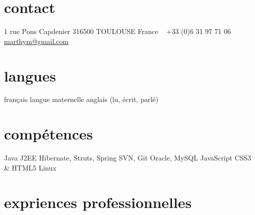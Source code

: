 \documentclass{friggeri-cv} 	%
\begin{document}


\begin{aside} %
\section{contact}
1 rue Pons Capdenier
316500 TOULOUSE
France
~
+33 (0)6 31 97 71 06
\href{mailto:marthym@gmail.com}{marthym@gmail.com}
\section{langues}
français langue maternelle
anglais (lu, écrit, parlé)
\section{compétences}
Java J2EE
Hibernate, Struts, Spring
SVN, Git
Oracle, MySQL
JavaScript
CSS3 \& HTML5
Linux
\end{aside}

\section{expriences professionnelles}
\end{document}
